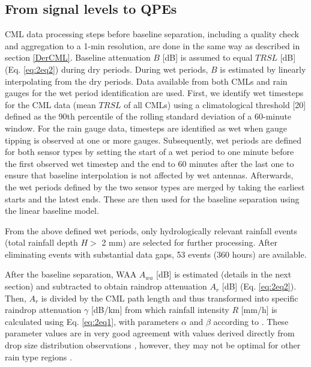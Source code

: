 \documentclass{ctuthesis}\usepackage[]{graphicx}\usepackage[]{color}
\begin{document}
\subsection{From signal levels to QPEs} \label{paperIIMethA}

CML data processing steps before baseline separation, including a quality check and aggregation to a 1-min resolution, are done in the same way as described in section \ref{DerCML}. Baseline attenuation $B$ [dB] is assumed to equal $TRSL$ [dB] (Eq. \ref{eq:2eq2}) during dry periods. During wet periods, $B$ is estimated by linearly interpolating from the dry periods. Data available from both CMLs and rain gauges for the wet period identification are used. First, we identify wet timesteps for the CML data (mean $TRSL$ of all CMLs) using a climatological threshold [20] defined as the 90th percentile of the rolling standard deviation of a 60-minute window. For the rain gauge data, timesteps are identified as wet when gauge tipping is observed at one or more gauges. Subsequently, wet periods are defined for both sensor types by setting the start of a wet period to one minute before the first observed wet timestep and the end to 60 minutes after the last one to ensure that baseline interpolation is not affected by wet antennas. Afterwards, the wet periods defined by the two sensor types are merged by taking the earliest starts and the latest ends. These are then used for the baseline separation using the linear baseline model.

From the above defined wet periods, only hydrologically relevant rainfall events (total rainfall depth $H >$ 2 mm) are selected for further processing. After eliminating events with substantial data gaps, 53 events (360 hours) are available.

After the baseline separation, WAA $A_{wa}$ [dB] is estimated (details in the next section) and subtracted  to obtain raindrop attenuation $A_r$ [dB] (Eq. \ref{eq:2eq2}). Then, $A_r$ is divided by the CML path length and thus transformed into specific raindrop attenuation $\gamma$ [dB/km] from which rainfall intensity $R$ [mm/h] is calculated using Eq. \ref{eq:2eq1}, with parameters $\alpha$ and $\beta$ according to \cite{recommendation2005838}. These parameter values are in very good agreement with values derived directly from drop size distribution observations \citep{chwalaCommercialMicrowaveLink2019, valtrExcessAttenuationCaused2019}, however, they may not be optimal for other rain type regions \citep{riosgaonaRainfallRetrievalCommercial2018}.
\end{document}
